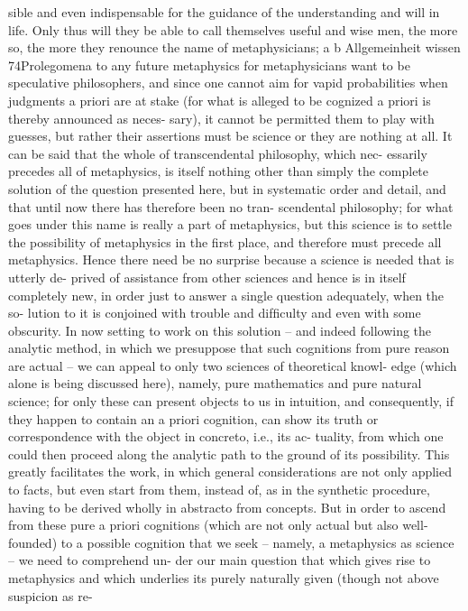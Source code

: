 sible and even indispensable for the guidance of the understanding and
will in life. Only thus will they be able to call themselves useful and wise
men, the more so, the more they renounce the name of metaphysicians;
a
b
Allgemeinheit
wissen
74Prolegomena to any future metaphysics
for metaphysicians want to be speculative philosophers, and since one
cannot aim for vapid probabilities when judgments a priori are at stake
(for what is alleged to be cognized a priori is thereby announced as neces-
sary), it cannot be permitted them to play with guesses, but rather their
assertions must be science or they are nothing at all.
It can be said that the whole of transcendental philosophy, which nec-
essarily precedes all of metaphysics, is itself nothing other than simply
the complete solution of the question presented here, but in systematic
order and detail, and that until now there has therefore been no tran-
scendental philosophy; for what goes under this name is really a part of
metaphysics, but this science is to settle the possibility of metaphysics
in the ﬁrst place, and therefore must precede all metaphysics. Hence
there need be no surprise because a science is needed that is utterly de-
prived of assistance from other sciences and hence is in itself completely
new, in order just to answer a single question adequately, when the so-
lution to it is conjoined with trouble and difﬁculty and even with some
obscurity.
In now setting to work on this solution – and indeed following the
analytic method, in which we presuppose that such cognitions from pure
reason are actual – we can appeal to only two sciences of theoretical knowl-
edge (which alone is being discussed here), namely, pure mathematics and
pure natural science; for only these can present objects to us in intuition,
and consequently, if they happen to contain an a priori cognition, can
show its truth or correspondence with the object in concreto, i.e., its ac-
tuality, from which one could then proceed along the analytic path to
the ground of its possibility. This greatly facilitates the work, in which
general considerations are not only applied to facts, but even start from
them, instead of, as in the synthetic procedure, having to be derived
wholly in abstracto from concepts.
But in order to ascend from these pure a priori cognitions (which are
not only actual but also well-founded) to a possible cognition that we
seek – namely, a metaphysics as science – we need to comprehend un-
der our main question that which gives rise to metaphysics and which
underlies its purely naturally given (though not above suspicion as re-
